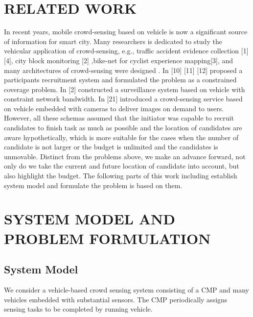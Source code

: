 \documentclass[journal]{IEEEtran}
\begin{document}
\section{RELATED WORK}
In recent years, mobile crowd-sensing based on vehicle is now a significant source of information for smart city. Many researchers is dedicated to study the vehicular application of crowd-sensing, e.g., traffic accident evidence collection [1][4], city block monitoring [2] ,bike-net for cyclist experience mapping[3], and many architectures of crowd-sensing were designed . In [10] [11] [12] proposed a participants recruitment system and formulated the problem as a constrained coverage problem. In [2] constructed a surveillance system based on vehicle with constraint network bandwidth. In [21] introduced a crowd-sensing service based on vehicle embedded with cameras to deliver images on demand to users. However, all these schemas assumed that the initiator was capable to recruit candidates to finish task as much as possible and the location of candidates are aware hypothetically, which is more suitable for the cases when the number of candidate is not larger or the budget is unlimited and the candidates is unmovable. Distinct from the problems above, we make an advance forward, not only do we take the current and future location of candidate into account, but also highlight the budget. The following parts of this work including establish system model and formulate the problem is based on them.
\section{SYSTEM MODEL AND PROBLEM FORMULATION}
\subsection{System Model }
We consider a vehicle-based crowd sensing system consisting of a CMP and many vehicles embedded with substantial sensors. The CMP periodically assigns sensing tasks to be completed by running vehicle. 
\end{document}
